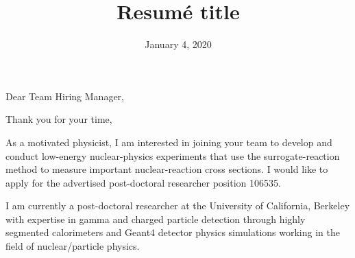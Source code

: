 \documentclass[11pt]{moderncv}        %
\title{Resumé title}                               %
\begin{document}
\date{January 4, 2020}
\opening{Dear Team Hiring Manager,}
\closing{Thank you for your time,}
\makelettertitle

\justifying
As a motivated physicist, I am interested in joining your team to develop and
conduct low-energy nuclear-physics experiments that use the surrogate-reaction
method to measure important nuclear-reaction cross sections.
I would like to apply for the advertised post-doctoral researcher position
106535.

I am currently a post-doctoral researcher at the University of California,
Berkeley with expertise in gamma and charged particle detection through highly
segmented calorimeters and Geant4 detector physics simulations working in the
field of nuclear/particle physics.
\end{document}
